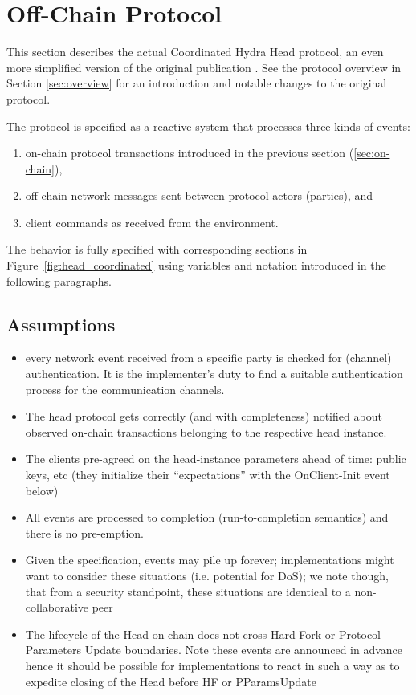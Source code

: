 \section{Off-Chain Protocol}\label{sec:offchain}

This section describes the actual Coordinated Hydra Head protocol, an even more simplified version of the original publication \cite{hydrahead20}. See the protocol overview in Section \ref{sec:overview} for an introduction and notable changes to the original protocol.

The protocol is specified as a reactive system that processes three kinds of events:
\begin{enumerate}
  \item on-chain protocol transactions introduced in the previous section (\ref{sec:on-chain}),
  \item off-chain network messages sent between protocol actors (parties), and
  \item client commands as received from the environment.
\end{enumerate}

The behavior is fully specified with corresponding sections in
Figure~\ref{fig:head_coordinated} using variables and notation introduced in the
following paragraphs.

\subsection{Assumptions}
\begin{itemize}
  \item every network event received from a specific party is checked for
        (channel) authentication. It is the implementer’s duty to find a
        suitable authentication process for the communication channels.
  \item The head protocol gets correctly (and with completeness) notified about
        observed on-chain transactions belonging to the respective head
        instance.
  \item The clients pre-agreed on the head-instance parameters ahead of time:
        public keys, etc (they initialize their “expectations” with the
        OnClient-Init event below)
  \item All events are processed to completion (run-to-completion semantics) and there is no pre-emption.
  \item Given the specification, events may pile up forever; implementations
        might want to consider these situations (i.e. potential for DoS); we
        note though, that from a security standpoint, these situations are
        identical to a non-collaborative peer
  \item The lifecycle of the Head on-chain does not cross Hard Fork or Protocol
        Parameters Update boundaries. Note these events are announced in advance
        hence it should be possible for implementations to react in such a way
        as to expedite closing of the Head before HF or PParamsUpdate
\end{itemize}

